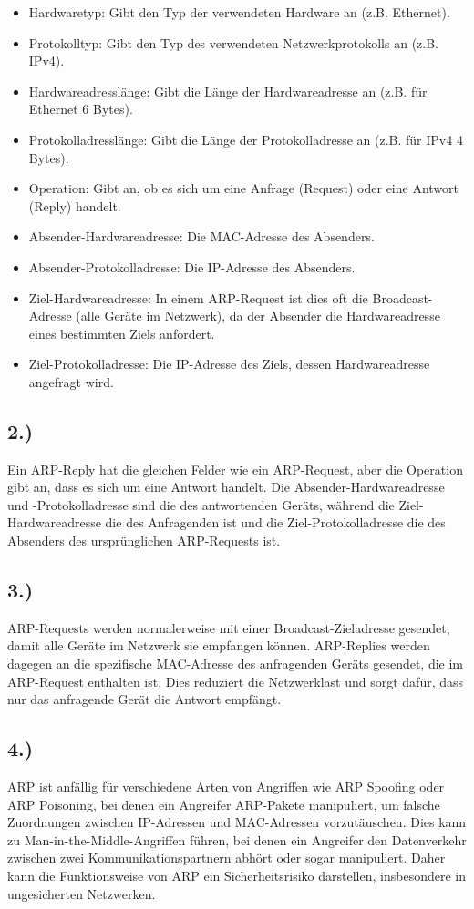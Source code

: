 \documentclass[a4paper]{scrartcl}
\begin{document}
\begin{itemize}
    \item Hardwaretyp: Gibt den Typ der verwendeten Hardware an (z.B. Ethernet).
    \item Protokolltyp: Gibt den Typ des verwendeten Netzwerkprotokolls an (z.B. IPv4).
    \item Hardwareadresslänge: Gibt die Länge der Hardwareadresse an (z.B. für Ethernet 6 Bytes).
    \item Protokolladresslänge: Gibt die Länge der Protokolladresse an (z.B. für IPv4 4 Bytes).
    \item Operation: Gibt an, ob es sich um eine Anfrage (Request) oder eine Antwort (Reply) handelt.
    \item Absender-Hardwareadresse: Die MAC-Adresse des Absenders.
    \item Absender-Protokolladresse: Die IP-Adresse des Absenders.
    \item Ziel-Hardwareadresse: In einem ARP-Request ist dies oft die Broadcast-Adresse (alle Geräte im Netzwerk), da der Absender die Hardwareadresse eines bestimmten Ziels anfordert.
    \item Ziel-Protokolladresse: Die IP-Adresse des Ziels, dessen Hardwareadresse angefragt wird.
\end{itemize}

\subsection*{2.)}
Ein ARP-Reply hat die gleichen Felder wie ein ARP-Request, aber die Operation gibt an, dass es sich um eine Antwort handelt. Die Absender-Hardwareadresse und -Protokolladresse sind die des antwortenden Geräts, während die Ziel-Hardwareadresse die des Anfragenden ist und die Ziel-Protokolladresse die des Absenders des ursprünglichen ARP-Requests ist.

\subsection*{3.)}

ARP-Requests werden normalerweise mit einer Broadcast-Zieladresse gesendet, damit alle Geräte im Netzwerk sie empfangen können. ARP-Replies werden dagegen an die spezifische MAC-Adresse des anfragenden Geräts gesendet, die im ARP-Request enthalten ist. Dies reduziert die Netzwerklast und sorgt dafür, dass nur das anfragende Gerät die Antwort empfängt.

\subsection*{4.)}
ARP ist anfällig für verschiedene Arten von Angriffen wie ARP Spoofing oder ARP Poisoning, bei denen ein Angreifer ARP-Pakete manipuliert, um falsche Zuordnungen zwischen IP-Adressen und MAC-Adressen vorzutäuschen. Dies kann zu Man-in-the-Middle-Angriffen führen, bei denen ein Angreifer den Datenverkehr zwischen zwei Kommunikationspartnern abhört oder sogar manipuliert. Daher kann die Funktionsweise von ARP ein Sicherheitsrisiko darstellen, insbesondere in ungesicherten Netzwerken.
\end{document}
